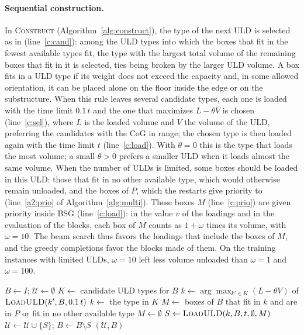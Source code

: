 \paragraph{Sequential construction.}
In \textsc{Construct} (Algorithm~\ref{alg:construct}), the type of the next ULD is selected as in
\citet{Hessler2025} (line~\ref{c:cand}): among the
ULD types into which the boxes that fit in the fewest available types fit, the type with the
largest total volume of the remaining boxes that fit in it is selected, ties being broken by the
larger ULD volume. A box fits in a ULD type if its weight does not exceed the capacity and, in
some allowed orientation, it can be placed alone on the floor inside the edge or on the
substructure. When this rule leaves several candidate types, each one is loaded with the time
limit $0.1\,t$ and the one that maximizes $L - \theta V$ is chosen (line~\ref{c:sel}), where $L$
is the loaded volume and $V$ the volume of the ULD, preferring the candidates with the CoG in
range; the chosen type is then loaded again with the time limit $t$ (line~\ref{c:load}). With $\theta = 0$ this is the type that loads the
most volume; a small $\theta > 0$ prefers a smaller ULD when it loads almost the same volume.
When the number of ULDs is limited, some boxes should be loaded in this ULD: those that fit in no
other available type, which would otherwise remain unloaded, and the boxes of $P$, which
the restarts give priority to (line~\ref{a2:prio} of Algorithm~\ref{alg:multi}). These boxes $M$
(line~\ref{c:prio}) are given priority inside BSG (line~\ref{c:load}): in the value $v$ of the
loadings and in the evaluation of the blocks, each box of $M$ counts as $1 + \omega$ times its
volume, with $\omega = 10$. The beam search thus favors the loadings that include the boxes of
$M$, and the greedy completions favor the blocks made of them. On the training instances with
limited ULDs, $\omega = 10$ left less volume unloaded than $\omega = 1$ and $\omega = 100$.

\begin{algorithm}[htbp]
\caption{\textsc{Construct}$(P)$: sequential construction; the boxes of $P$ are given priority
(restarts).}
\label{alg:construct}
\begin{algorithmic}[1]
\State $B \gets I$; $\mathcal{U} \gets \emptyset$ 
	\State $K \gets$ candidate ULD types for $B$ \citep{Hessler2025} \label{c:cand}
		\State $k \gets \arg\max_{k' \in K} (L - \theta V)$ of $\textsc{LoadULD}(k', B, 0.1\,t)$ \label{c:sel}
	\Else{} $k \gets$ the type in $K$
	\EndIf
		\State $M \gets$ boxes of $B$ that fit in $k$ and are in $P$ or fit in no other available type \label{c:prio}
	\Else{} $M \gets \emptyset$
	\EndIf
	\State $S \gets \textsc{LoadULD}(k, B, t, \emptyset, M)$  \label{c:load}
	\State $\mathcal{U} \gets \mathcal{U} \cup \{S\}$; $B \gets B \setminus S$
\EndWhile
\State \Return $(\mathcal{U}, B)$
\end{algorithmic}
\end{algorithm}

